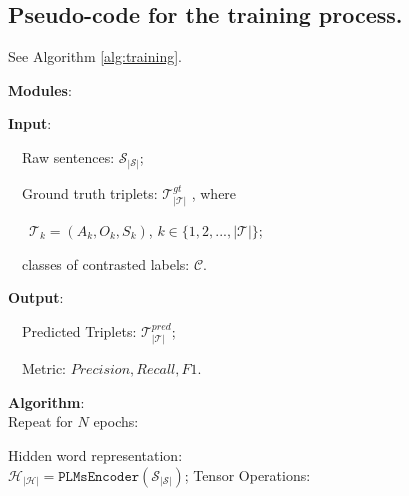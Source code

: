 \documentclass[11pt]{article}
\begin{document}
\subsection{Pseudo-code for the training process.}
See Algorithm \ref{alg:training}.
\label{sec:pseudo}
\begin{algorithm}[!ht]
\small

\caption{.}

\textbf{Modules}:










\textbf{Input}: 

\ \ Raw sentences: $\mathcal{S}_{|\mathcal{S}|}$; 

\ \ Ground truth triplets: $\mathcal{T}_{|\mathcal{T}|}^{gt}$ , where

\ \ \ $\mathcal{T}_k=(A_k, O_k, S_k)$, $k \in \{1,2,...,|\mathcal{T}|\}$;

\ \  classes of contrasted labels: $\mathcal{C}$.

\textbf{Output}: 



\ \ Predicted Triplets: $\mathcal{T}_{|\mathcal{T}|}^{pred}$;

\ \ Metric: $\mathit{Precision}, \mathit{Recall}, \mathit{F1}$.

\textbf{Algorithm}:\\
Repeat for $N$ epochs:

\begin{algorithmic}[1] %
\STATE Hidden word representation: \\ $\mathcal{H}_{|\mathcal{H}|} = \texttt{PLMsEncoder}(\mathcal{S}_{|\mathcal{S}|})$;
\STATE Tensor Operations: 


\end{algorithmic}
\end{algorithm}
\end{document}

